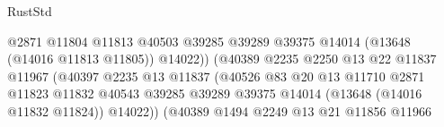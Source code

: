 \begin{lexlean}{RustStd}
\begin{coremodule}
                                                      @2871
                                                      @11804
                                                      @11813
                                                      @40503
                                                      @39285
                                                      @39289
                                                      @39375
                                                      @14014
                                                      (@13648 (@14016 @11813 @11805))
                                                      @14022))
                                                  (@40389
                                                    @2235
                                                    @2250
                                                    @13
                                                    @22
                                                    @11837
                                                    @11967
                                                    (@40397
                                                      @2235
                                                      @13
                                                      @11837
                                                      (@40526
                                                        @83
                                                        @20
                                                        @13
                                                        @11710
                                                        @2871
                                                        @11823
                                                        @11832
                                                        @40543
                                                        @39285
                                                        @39289
                                                        @39375
                                                        @14014
                                                        (@13648 (@14016 @11832 @11824))
                                                        @14022))
                                                    (@40389
                                                      @1494
                                                      @2249
                                                      @13
                                                      @21
                                                      @11856
                                                      @11966

\end{coremodule}
\end{lexlean}
